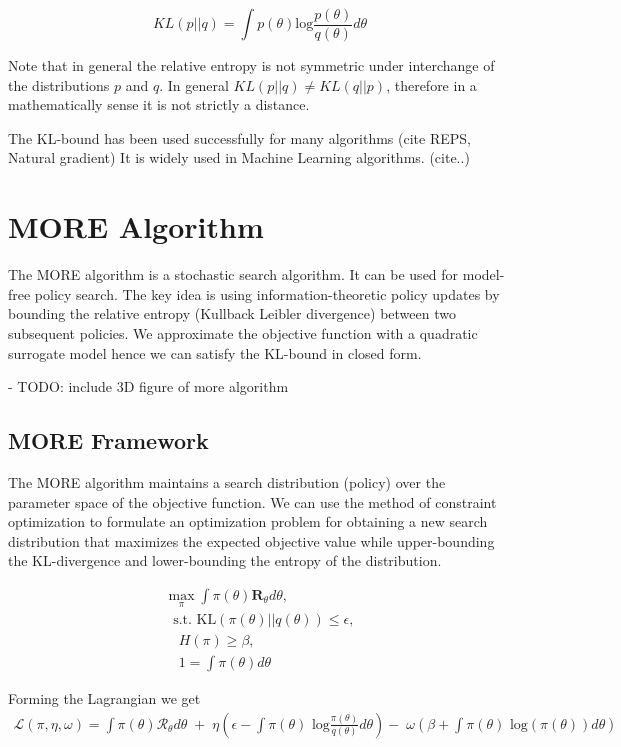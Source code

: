 $$ KL(p || q) = \int p(\theta) \text{log} \frac{p(\theta)}{q(\theta)} d \theta $$

Note that in general the relative entropy is not symmetric under interchange of the
distributions $p$ and $q$. In general $KL(p || q) \neq KL(q || p) $, therefore
in a mathematically sense it is not strictly a distance.

The KL-bound has been used successfully for many algorithms (cite REPS, Natural gradient)
It is widely used in Machine Learning algorithms. (cite..)

\section{MORE Algorithm}
The MORE algorithm is a stochastic search algorithm. It can be used for
model-free policy search. The key idea is using information-theoretic policy updates
by bounding the relative entropy (Kullback Leibler divergence) between two subsequent
policies. We approximate the objective function with a quadratic surrogate model hence
we can satisfy the KL-bound in closed form.


- TODO: include 3D figure of more algorithm

\subsection{MORE Framework}
The MORE algorithm maintains a search distribution (policy) over the parameter space
of the objective function. We can use the method of constraint optimization
to formulate an optimization problem for obtaining a new search distribution that
maximizes the expected objective value while upper-bounding the KL-divergence and
lower-bounding the entropy of the distribution.

\begin{align}
 \max_{\pi} \int \pi(\theta) \mathbf{R}_{\theta} d\theta, \\
\; \text{ s.t. KL}(\pi(\theta)||q(\theta)) \leq \epsilon, \\
\quad H(\pi) \geq \beta, \\
\quad 1 = \int \pi(\theta) d\theta
\end{align}

Forming the Lagrangian we get
\begin{align} \mathcal{L}(\pi, \eta, \omega) = 
\int \pi(\theta) \mathcal{R}_{\theta} d\theta \; + \; 
\eta  \left(\epsilon - \int \pi(\theta) \text{ log}
 \frac{\pi(\theta)}{q(\theta)} d\theta\right)
 - \; \omega \left(\beta + \int \pi(\theta) \text{ log}(\pi(\theta)) d\theta\right)
\end{align}


